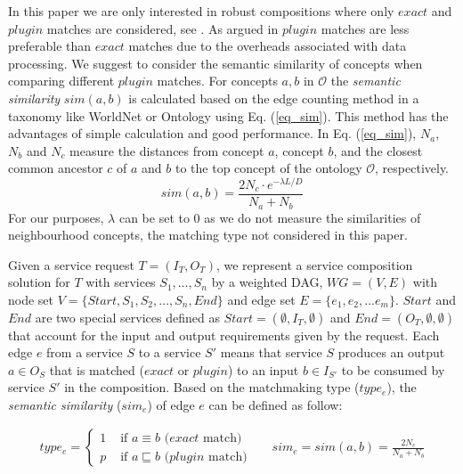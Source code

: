 \documentclass{llncs}
\begin{document}
In this paper we are only interested in robust compositions where only $exact$ and $plugin$ matches are considered, see \cite{lecue2009optimizing}. As argued in \cite{lecue2009optimizing} $plugin$ matches are less preferable than $exact$ matches due to the overheads associated with data processing. We suggest to consider the semantic similarity of concepts when comparing different $plugin$ matches. For concepts $a, b$ in $\mathcal{O}$ the \emph{semantic similarity} $sim(a, b)$ is calculated based on the edge counting method in a taxonomy like WorldNet or Ontology using Eq. (\ref{eq_sim}). This method \cite{shet2012new} has the advantages of simple calculation and good performance.  In Eq. (\ref{eq_sim}), $N_a$, $N_b$ and $N_c$ measure the distances from concept $a$, concept $b$, and the closest common ancestor $c$ of $a$ and $b$ to the top concept of the ontology $\mathcal{O}$, respectively. 
\begin{equation}
sim(a, b){=} \frac{2N_c \cdot e^{-\lambda L/D} }{N_{a}+N_{b}}
\label{eq_sim}
\end{equation}
\noindent For our purposes, $\lambda$ can be set to 0 as we do not measure the similarities of neighbourhood concepts, the matching type not considered in this paper. 

Given a service request $T=(I_T,O_T)$, we represent a service composition solution for $T$ with services $S_1,\ldots,S_n$  by a weighted DAG, $WG=(V,E)$ with node set $V=\{Start, S_1, S_2, \ldots, S_n, End\}$ and edge set $E = \{e_{1}, e_{2},... e_{m} \}$. $Start$ and $End$ are two special services defined as $Start = (\emptyset, I_T, \emptyset )$ and $End  = (O_T, \emptyset, \emptyset)$ that account for the input and output requirements given by the request. Each edge $e$ from a service $S$ to a service $S'$ means that service $S$ produces an output $a\in O_S$ that is matched ($exact$ or $plugin$) to an input $b\in I_{S'}$ to be consumed by service $S'$ in the composition. Based on the matchmaking type ($type_e$), the \emph{semantic similarity} ($sim_e$) of edge $e$ can be defined as follow:

\begin{align*}
type_e = 
\begin{cases}
	1 & \text{ if $a\equiv b$ ($exact$ match)}\\
	p & \text{ if $a \sqsubseteq b$ ($plugin$ match)}
\end{cases}
&&
sim_e = sim(a,b) = \frac{2N_c}{N_{a}+N_{b}}
\end{align*}

\end{document}
